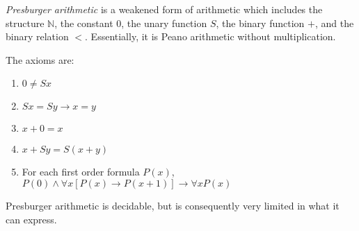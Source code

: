 \documentclass[12pt]{article}
\begin{document}
\emph{Presburger arithmetic} is a weakened form of arithmetic which includes the structure $\mathbb{N}$, the constant $0$, the unary function $S$, the binary function $+$, and the binary relation $<$.  Essentially, it is Peano arithmetic without multiplication.

The axioms are:
\begin{enumerate}
\item $0\not= Sx$
\item $Sx=Sy\rightarrow x=y$
\item $x+0=x$
\item $x+Sy=S(x+y)$
\item For each first order formula $P(x)$, $P(0)\wedge\forall x[P(x)\rightarrow P(x+1)]\rightarrow\forall x P(x)$
\end{enumerate}

Presburger arithmetic is decidable, but is consequently very limited in what it can express.
\end{document}

